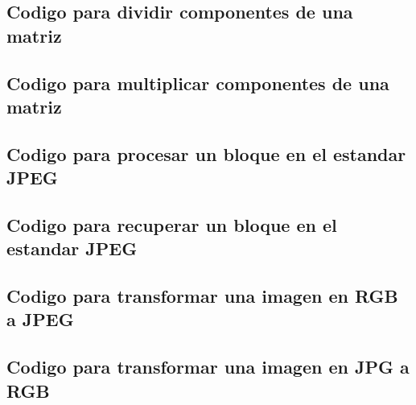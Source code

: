 \documentclass[%
	final,
	reprint,
	notitlepage,
	narroweqnarray,
	inline,
	twoside,
	invited
	]{ieee}
\begin{document}
\subsection{Codigo para dividir componentes de una matriz}
\newpage

\subsection{Codigo para multiplicar componentes de una matriz}


\subsection{Codigo para procesar un bloque en el estandar JPEG}

\subsection{Codigo para recuperar un bloque en el estandar JPEG}

\subsection{Codigo para transformar una imagen en RGB a JPEG}

\subsection{Codigo para transformar una imagen en JPG a RGB}
\end{document}
